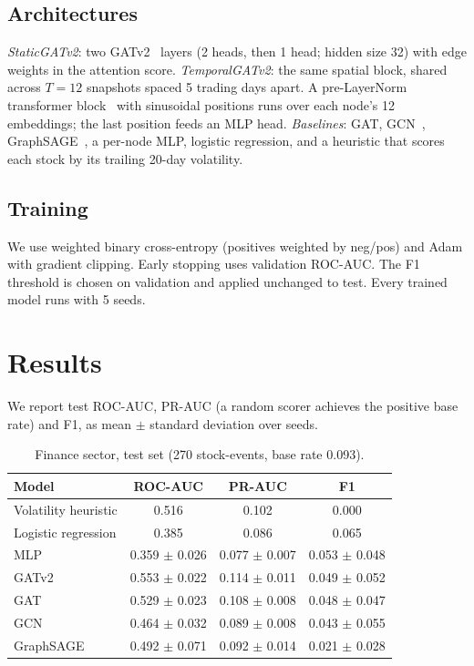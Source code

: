 \documentclass[conference]{IEEEtran}
\begin{document}
\subsection{Architectures}
\emph{StaticGATv2}: two GATv2~\cite{brody2022} layers (2 heads, then 1 head; hidden size 32)
with edge weights in the attention score. \emph{TemporalGATv2}: the same spatial block,
shared across $T=12$ snapshots spaced 5 trading days apart. A pre-LayerNorm transformer
block~\cite{vaswani2017} with sinusoidal positions runs over each node's 12 embeddings; the
last position feeds an MLP head. \emph{Baselines}: GAT, GCN~\cite{kipf2017},
GraphSAGE~\cite{hamilton2017}, a per-node MLP, logistic regression, and a heuristic that
scores each stock by its trailing 20-day volatility.

\subsection{Training}
We use weighted binary cross-entropy (positives weighted by neg/pos) and Adam with gradient
clipping. Early stopping uses validation ROC-AUC. The F1 threshold is chosen on validation
and applied unchanged to test. Every trained model runs with 5 seeds.

\section{Results}
We report test ROC-AUC, PR-AUC (a random scorer achieves the positive base rate) and F1,
as mean $\pm$ standard deviation over seeds.

\begin{table}[t]
\centering
\caption{Finance sector, test set (270 stock-events, base rate 0.093).}
\label{tab:fin}
\begin{tabular}{lccc}
\toprule
Model & ROC-AUC & PR-AUC & F1 \\
\midrule
Volatility heuristic & 0.516 & 0.102 & 0.000 \\
Logistic regression & 0.385 & 0.086 & 0.065 \\
MLP & 0.359 $\pm$ 0.026 & 0.077 $\pm$ 0.007 & 0.053 $\pm$ 0.048 \\
GATv2 & 0.553 $\pm$ 0.022 & 0.114 $\pm$ 0.011 & 0.049 $\pm$ 0.052 \\
GAT & 0.529 $\pm$ 0.023 & 0.108 $\pm$ 0.008 & 0.048 $\pm$ 0.047 \\
GCN & 0.464 $\pm$ 0.032 & 0.089 $\pm$ 0.008 & 0.043 $\pm$ 0.055 \\
GraphSAGE & 0.492 $\pm$ 0.071 & 0.092 $\pm$ 0.014 & 0.021 $\pm$ 0.028 \\
\bottomrule
\end{tabular}
\end{table}
\end{document}
